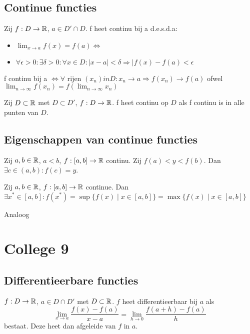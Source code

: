 \documentclass[week=1]{homework}
\begin{document}
	\subsection*{Continue functies}
	\Def Zij $f: D \rightarrow \mathbb{R}$, $a \in D' \cap D$. f heet continu bij a d.e.s.d.a:
	\begin{itemize}
		\item $\lim_{x \rightarrow a} f(x) = f(a) \Leftrightarrow $
		\item $\forall \epsilon > 0: \exists \delta > 0: \forall x \in D: \mid x-a \mid < \delta \Rightarrow \mid f(x) - f(a) < \epsilon$
	\end{itemize}
	
	\Stel f continu bij a $\Leftrightarrow \forall \text{ rijen } (x_n) in D: x_n \rightarrow a \Rightarrow f(x_n) \rightarrow f(a) $ ofwel $\lim_{n \rightarrow \infty} f(x_n) = f( \lim_{n \rightarrow \infty} x_n)$
	
	\Def Zij $D \subset \mathbb{R}$ met $D \subset D'$, $f: D \rightarrow \mathbb{R}$. f heet continu op $D$ als f continu is in alle punten van $D$. 
	
	\subsection*{Eigenschappen van continue functies}
	\Stel[Tussenwaardestelling] Zij $a,b \in \mathbb{R}$, $a<b$, $f: [a,b] \rightarrow \mathbb{R}$ continu. Zij $f(a) < y < f(b)$. Dan $\exists c \in (a,b): f(c) = y$. 
	
	\Stel[Maximaaleigenschap] Zij $a,b \in \mathbb{R}$, $f:[a,b] \rightarrow \mathbb{R}$ continue. Dan $\exists x^* \in [a,b]: f(x^*) = \sup \{f(x) \mid x \in [a,b] \} = \max \{f(x) \mid x \in [a,b] \}$
	
	\Stel[Minimaaleigenschap] Analoog
	
	\newpage
	\section*{College 9}
		
	\subsection*{Differentieerbare functies}
	
	\Def[Differentieerbaarheid] $f : D \to \mathbb{R}$, $a \in D \cap D'$ met $D \subset \mathbb{R}$.
	$f$ heet differentieerbaar bij $a$ als 
	\[
		\lim_{x \to a} \frac{f(x) - f(a)}{x-a} = \lim_{h \to 0} \frac{f(a+h) - f(a)}{h}
	\]
	bestaat. Deze heet dan afgeleide van $f$ in $a$. 
	
\end{document}
